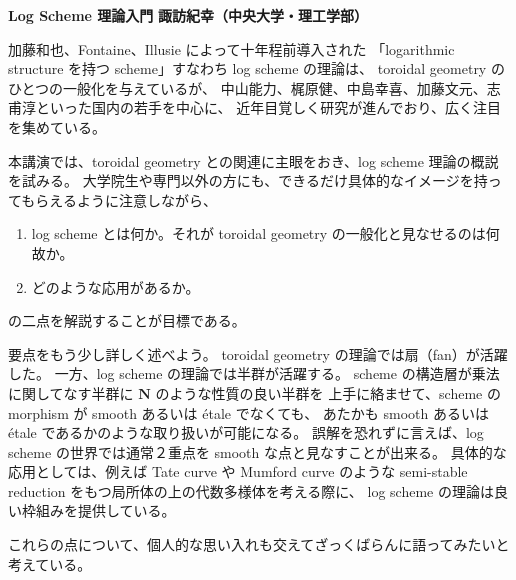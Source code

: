 \documentclass[uplatex,dvipdfmx]{jlreq}
\begin{document}
\noindent
{\large\bfseries Log Scheme 理論入門}
\hfill
{\large\bfseries 諏訪紀幸（中央大学・理工学部）}

\bigskip

加藤和也、Fontaine、Illusie によって十年程前導入された
「logarithmic structure を持つ scheme」すなわち log scheme の理論は、
toroidal geometry のひとつの一般化を与えているが、
中山能力、梶原健、中島幸喜、加藤文元、志甫淳といった国内の若手を中心に、
近年目覚しく研究が進んでおり、広く注目を集めている。

本講演では、toroidal geometry との関連に主眼をおき、log scheme 理論の概説を試みる。
大学院生や専門以外の方にも、できるだけ具体的なイメージを持ってもらえるように注意しながら、
\begin{enumerate}
  \setlength{\itemsep}{2pt}
  \item[(1)] log scheme とは何か。それが toroidal geometry の一般化と見なせるのは何故か。
  \item[(2)] どのような応用があるか。
\end{enumerate}
の二点を解説することが目標である。

要点をもう少し詳しく述べよう。
toroidal geometry の理論では扇（fan）が活躍した。
一方、log scheme の理論では半群が活躍する。
scheme の構造層が乗法に関してなす半群に $\mathbf{N}$ のような性質の良い半群を
上手に絡ませて、scheme の morphism が smooth あるいは étale でなくても、
あたかも smooth あるいは étale であるかのような取り扱いが可能になる。
誤解を恐れずに言えば、log scheme の世界では通常２重点を smooth な点と見なすことが出来る。
具体的な応用としては、例えば Tate curve や Mumford curve のような
semi-stable reduction をもつ局所体の上の代数多様体を考える際に、
log scheme の理論は良い枠組みを提供している。

これらの点について、個人的な思い入れも交えてざっくばらんに語ってみたいと考えている。
\end{document}
